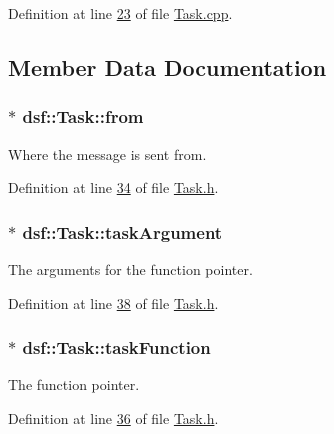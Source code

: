 Definition at line \hyperlink{_task_8cpp_source_l00023}{23} of file \hyperlink{_task_8cpp_source}{Task.\+cpp}.



\subsection{Member Data Documentation}
\hypertarget{classdsf_1_1_task_afc1faf30dab0d57501dfdcb4ef7b5450}{}
\subsubsection[{from}]{$\ast$ dsf\+::\+Task\+::from}\label{classdsf_1_1_task_afc1faf30dab0d57501dfdcb4ef7b5450}
Where the message is sent from. 

Definition at line \hyperlink{_task_8h_source_l00034}{34} of file \hyperlink{_task_8h_source}{Task.\+h}.

\hypertarget{classdsf_1_1_task_a8a095d8a36668f6500d4df8c24dbef8d}{}
\subsubsection[{task\+Argument}]{$\ast$ dsf\+::\+Task\+::task\+Argument}\label{classdsf_1_1_task_a8a095d8a36668f6500d4df8c24dbef8d}
The arguments for the function pointer. 

Definition at line \hyperlink{_task_8h_source_l00038}{38} of file \hyperlink{_task_8h_source}{Task.\+h}.

\hypertarget{classdsf_1_1_task_a681617cab34fbae641c5b0cf4be46659}{}
\subsubsection[{task\+Function}]{$\ast$ dsf\+::\+Task\+::task\+Function}\label{classdsf_1_1_task_a681617cab34fbae641c5b0cf4be46659}
The function pointer. 

Definition at line \hyperlink{_task_8h_source_l00036}{36} of file \hyperlink{_task_8h_source}{Task.\+h}.

